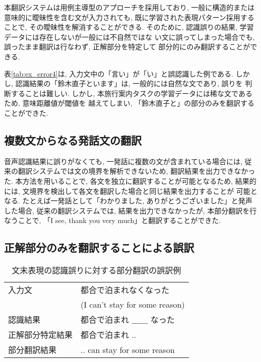 本翻訳システムは用例主導型のアプローチを採用しており, 一般に構造的または
意味的に曖昧性を含む文が入力されても, 既に学習された表現パターン採用することで, その曖昧性を解消することができる. 
そのために, 認識誤りの結果, 学習データには存在しないが一般には不自然ではな
い文に誤ってしまった場合でも, 誤ったまま翻訳は行なわず, 正解部分を特定して
部分的にのみ翻訳することができる. 

表\ref{tab:ex_error4}は, 入力文中の「言い」が「い」と誤認識した例である. 
しかし, 認識結果の「鈴木直子といます」は, 一般的には自然な文であり, 誤りを
判断することは難しい. 
しかし, 本旅行案内タスクの学習データには稀な文であるため, 意味距離値が閾値を
越えてしまい, 「鈴木直子と」の部分のみを翻訳することができた. 

\subsection{複数文からなる発話文の翻訳}

音声認識結果に誤りがなくても, 一発話に複数の文が含まれている場合には, 
従来の翻訳システムでは文の境界を解析できないため, 翻訳結果を出力できなかった. 
本方法を用いることで, 各文を独立に翻訳することが可能となるため, 
結果的には, 文境界を検出して各文を翻訳した場合と同じ結果を出力することが
可能となる. 
たとえば一発話として「わかりました, ありがとうございました」と発声した場合, 
従来の翻訳システムでは, 結果を出力できなかったが, 本部分翻訳を行なうことで, 
「I see, thank you very much」と翻訳することができた. 

\subsection{正解部分のみを翻訳することによる誤訳}

\begin{table*}
\caption{文末表現の認識誤りに対する部分翻訳の誤訳例}
\label{tab:ex_error5}
\center
\begin{tabular}{|l|l|}
\hline
入力文 & 都合で泊まれなくなった\\ 
       & (I can't stay for some reason) \\ \hline
認識結果 & 都合で泊まれ ＿＿ なった \\ \hline
正解部分特定結果 & 都合で泊まれ .. \\ \hline
部分翻訳結果     & .. can stay for some reason \\ 
\hline 
 \end{tabular}
\end{table*}

